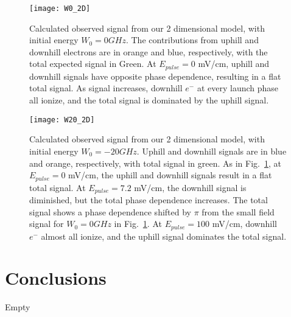 \documentclass[aps,pra,preprint,groupedaddress]{revtex4-1}
\begin{document}
\begin{figure}
	\texttt{[image: W0\_2D]}
	\caption{Calculated observed signal from our 2 dimensional model, with initial energy $W_0 = 0 GHz$. The contributions from uphill and downhill electrons are in orange and blue, respectively, with the total expected signal in Green. At $E_{pulse} = 0$ mV/cm, uphill and downhill signals have opposite phase dependence, resulting in a flat total signal. As signal increases, downhill $e^-$ at every launch phase all ionize, and the total signal is dominated by the uphill signal.}
	\label{fig:2DW0}
\end{figure}

\begin{figure}
	\texttt{[image: W20\_2D]}
	\caption{Calculated observed signal from our 2 dimensional model, with initial energy $W_0 = -20 GHz$. Uphill and downhill signals are in blue and orange, respectively, with total signal in green. As in Fig.~\ref{fig:2DW0}, at $E_{pulse} = 0$ mV/cm, the uphill and downhill signals result in a flat total signal. At $E_{pulse} = 7.2$ mV/cm, the downhill signal is diminished, but the total phase dependence increases. The total signal shows a phase dependence shifted by $\pi$ from the small field signal for $W_0 = 0 GHz$ in Fig.~\ref{fig:2DW0}. At $E_{pulse} = 100$ mV/cm, downhill $e^-$ almost all ionize, and the uphill signal dominates the total signal.}
	\label{fig:2DW20}
\end{figure}

\section{\label{sec:conc} Conclusions}

Empty


%
\end{document}
